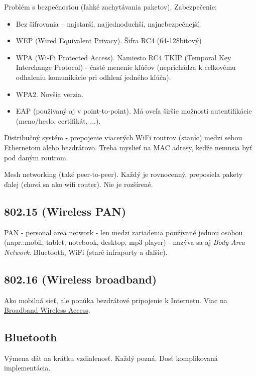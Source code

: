 \documentclass[10pt,a4paper]{article}
\begin{document}
Problém s bezpečnosťou (ľahké zachytávania paketov). Zabezpečenie: 
\begin{itemize}                                                 
\item Bez šifrovania -- najstarší, najjednoduchší, najnebezpečnejší.
\item WEP (Wired Equivalent Privacy). Šifra RC4 (64-128bitový)        
\item WPA (Wi-Fi Protected Access). Namiesto RC4 TKIP (Temporal Key Interchange Protocol) - časté menenie kľúčov (neprichádza k celkovému odhaleniu komunikácie pri odhlení jedného kľúča).
\item WPA2. Novšia verzia. 
\item EAP (použivaný aj v point-to-point). Má oveľa širšie možnosti autentifikácie (meno/heslo, certifikát, ...).
\end{itemize}
      
Distribučný systém - prepojenie viacerých WiFi routrov (staníc) medzi sebou Ethernetom alebo bezdrátovo. Treba myslieť na MAC adresy, keďže nemusia byť pod daným routrom. 

Mesh networking (také peer-to-peer). Každý je rovnocenný, preposiela pakety ďalej (chová sa ako wifi router). Nie je rozšírené. 
      
\subsection{802.15 (Wireless PAN)} 
PAN - personal area network - len medzi zariadenia používané jednou osobou (napr.:mobil, tablet, notebook, desktop, mp3 player) - nazýva sa aj \emph{Body Area Network}.
Bluetooth, WiFi (staré infraporty a ďalšie). 
\subsection{802.16 (Wireless broadband)}
Ako mobilná sieť, ale ponúka bezdrátové pripojenie k Internetu.
Viac na \href{http://en.wikipedia.org/wiki/Broadband\_Wireless\_Access}{Broadband Wireless Access}. 
       
\subsection{Bluetooth}           
Výmena dát na krátku vzdialenosť. Každý pozná. 
Dosť komplikovaná implementácia. 
                                                 
\end{document}
